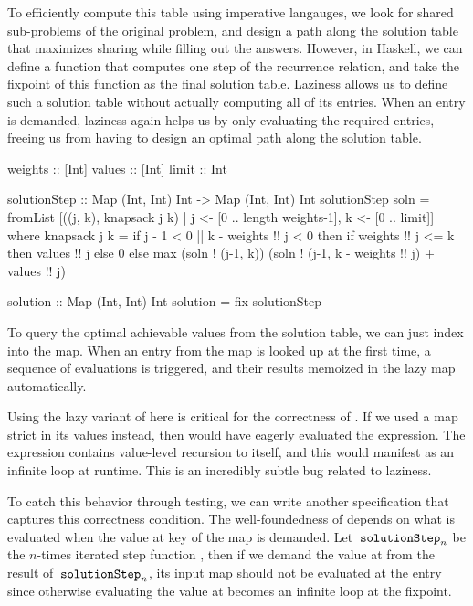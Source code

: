 \documentclass[acmsmall,review]{acmart}\settopmatter{}
\begin{document}
To efficiently compute this table using imperative langauges, we look
for shared sub-problems of the original problem, and design a path
along the solution table that maximizes sharing while filling out the
answers.
%
However, in Haskell, we can define a function that computes one step
of the recurrence relation, and take the fixpoint of this function as
the final solution table. Laziness allows us to define such a solution
table without actually computing all of its entries. When an entry is
demanded, laziness again helps us by only evaluating the required
entries, freeing us from having to design an optimal path along the
solution table.
%
\begin{inlinecode}
weights :: [Int]
values  :: [Int]
limit   :: Int

solutionStep :: Map (Int, Int) Int -> Map (Int, Int) Int
solutionStep soln =
  fromList [((j, k), knapsack j k) |
            j <- [0 .. length weights-1], k <- [0 .. limit]]
  where
    knapsack j k = if j - 1 < 0 || k - weights !! j < 0
                   then if weights !! j <= k then values !! j else 0
                   else max (soln ! (j-1, k))
                            (soln ! (j-1, k - weights !! j) + values !! j)

solution :: Map (Int, Int) Int
solution = fix solutionStep

\end{inlinecode}
%
To query the optimal achievable values from the solution table, we can
just index into the map. When an entry from the map is looked up at
the first time, a sequence of evaluations is triggered, and their
results memoized in the lazy map automatically.

Using the lazy variant of  here is critical for the
correctness of . If we used a map strict in its values
instead, then  would have eagerly evaluated the 
expression. The  expression contains value-level recursion to
 itself, and this would manifest as an infinite loop
at runtime. This is an incredibly subtle bug related to laziness.

To catch this behavior through testing, we can write another specification that
captures this correctness condition. The well-foundedness 
of  depends on what is evaluated when the value at key 
of the map is demanded. Let $\lk{solutionStep}_n$ be the $n$-times iterated
step function , then if we
demand the value at  from the result of $\lk{solutionStep}_n$, its
input map should not be evaluated at the  entry since otherwise
evaluating the value at  becomes an infinite loop at the fixpoint.
\end{document}
